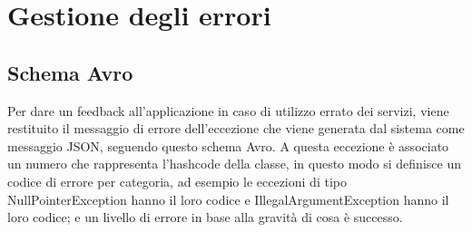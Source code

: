 \section{Gestione degli errori}
\subsection{Schema Avro}
\begin{center}
		{\selectfont
			
		}
\end{center}

Per dare un feedback all’applicazione in caso di utilizzo errato dei servizi, viene restituito il messaggio di errore dell’eccezione che viene generata dal sistema come messaggio JSON, seguendo questo schema Avro. A questa eccezione è associato un numero che rappresenta l’hashcode della classe, in questo modo si definisce un codice di errore per categoria, ad esempio le eccezioni di tipo NullPointerException hanno il loro codice e IllegalArgumentException hanno il loro codice; e un livello di errore in base alla gravità di cosa è successo.

